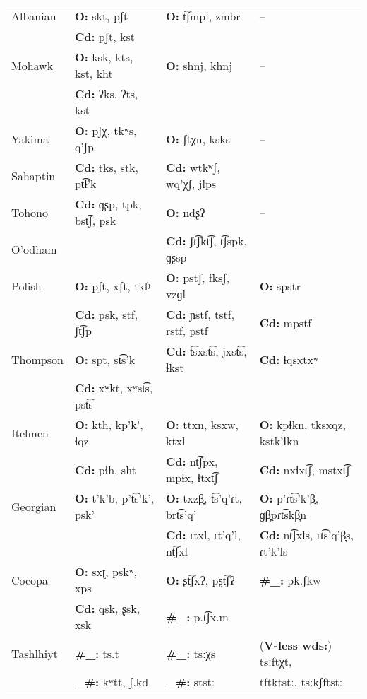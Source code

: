 {\begin{longtable}{llll}
{Albanian} & \textbf{O:} skt, pʃt & \textbf{O:} t͡ʃmpl, zmbr & --\\
            & \textbf{Cd:} pʃt, kst  \\
{Mohawk} & \textbf{O:} ksk, kts, kst, kht  & \textbf{O:} shnj, khnj & --\\
            & \textbf{Cd:} ʔks, ʔts, kst \\
{Yakima} & \textbf{O:} pʃχ, tkʷs, q’ʃp  & \textbf{O:} ʃtχn, ksks   & --\\
Sahaptin &  \textbf{Cd:} tks, stk, pt͡ɬ’k & \textbf{Cd:} wtkʷʃ, wq’χʃ, jlps\\\tablevspace
{Tohono} & \textbf{Cd:} ɡʂp, tpk, bst͡ʃ, psk & \textbf{O:} ndʂʔ & --\\
O’odham & & \textbf{Cd:} ʃt͡ʃkt͡ʃ, t͡ʃspk, ɡʂsp\\\tablevspace
{Polish} & \textbf{O:} pʃt, xʃt, tkfʲ  & \textbf{O:} pstʃ, fksʃ, vzɡl  & \textbf{O:} spstr \\
            & \textbf{Cd:} psk, stf, ʃt͡ʃp & \textbf{Cd:} ɲstf, tstf, rstf, pstf & \textbf{Cd:} mpstf\\
{Thompson} & \textbf{O:} spt, st͡s’k  & \textbf{Cd:} t͡sxst͡s, jxst͡s, ɬkst & \textbf{Cd:} ɬqsxtxʷ\\
           & \textbf{Cd:} xʷkt, xʷst͡s, pst͡s\\
{Itelmen} & \textbf{O:} kth, kp'k', ɬqz  & \textbf{O:} ttxn, ksxw, ktxl  & \textbf{O:} kpɬkn, tksxqz, kstk’ɬkn \\
            & \textbf{Cd:} pɬh, sht & \textbf{Cd:} nt͡ʃpx, mpɬx, ɬtxt͡ʃ & \textbf{Cd:} nxɬxt͡ʃ, mstxt͡ʃ\\
{Georgian} & \textbf{O:} t'k'b, p't͡s'k', psk’ & \textbf{O:} txzβ̞, t͡s’q’ɾt, brt͡s'q{}'  & \textbf{O:} p’ɾt͡s’k’β̞, ɡβ̞pɾt͡skβ̞n \\
            & & \textbf{Cd:} ɾtxl, ɾt'q'l, nt͡ʃxl & \textbf{Cd:} nt͡ʃxls, ɾt͡s’q’β̞s, ɾt'k'ls\\
{Cocopa} & \textbf{O:} sxʈ, pskʷ, xps  & \textbf{O:} ʂt͡ʃxʔ, pʂt͡ʃʔ& \textbf{\#\_:} pk.ʃkw\\
            & \textbf{Cd:} qsk, ʂsk, xsk  & \textbf{\#\_:} p.t͡ʃx.m \\
{Tashlhiyt} & \textbf{\#\_:} ts.t  & \textbf{\#\_:} ts:χs  & (\textbf{V-less wds:}) tsːftχt,\\
            & \textbf{\_\#:} kʷtt, ʃ.kd & \textbf{\_\#:} ststː & \hspace{2em} tftktstː, tsːkʃftstː\\ 
\end{longtable}}


